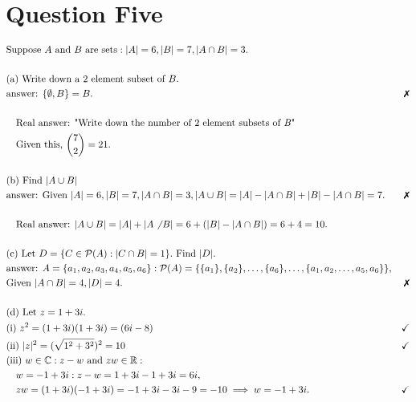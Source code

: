 \documentclass{article}
\begin{document}
    \section{Question Five}
        \begin{align*}
            &\text{Suppose }A \AND B \text{ are sets}: |A| = 6, |B| = 7, |A\cap B| = 3.\\
            &\\
            &\text{(a) Write down a 2 element subset of }B.\\
            &\text{answer: }\{\emptyset, B\} = B.&\xmark\\
            &\\
            &\quad\text{Real answer: "Write down the number of 2 element subsets of \textit{B}"}\\
            &\quad\text{Given this, } \binom{7}{2} = 21.\\
            &\\
            &\text{(b) Find }|A\cup B|\\
            &\text{answer: Given }|A| = 6, |B| = 7, |A\cap B| = 3, |A\cup B| = |A|-|A\cap B| + |B|-|A\cap B| = 7.&\xmark\\
            &\\
            &\quad\text{Real answer: }|A\cup B| = |A| + |A\not ~B| = 6 + (|B| - |A\cap B|) = 6 + 4 = 10.\\
            &\\
            &\text{(c) Let }D = \{C\in\power(A) : |C\cap B| = 1\}.\text{ Find }|D|.\\
            &\text{answer: }A = \{a_1, a_2, a_3, a_4, a_5, a_6\} : \power(A) = \{\{a_1\}, \{a_2\}, \dots, \{a_6\}, \dots, \{a_1, a_2, \dots, a_5, a_6\}\},\\
            &\text{Given }|A\cap B| = 4, |D| = 4.&\xmark\\
            &\\
            &\text{(d) Let }z = 1 + 3i.\\
            &\text{(i) }z^2 = (1+3i)(1+3i) = (6i - 8) & \checkmark\\
            &\text{(ii) }|z|^2 = (\sqrt{1^2 + 3^2})^2 = 10&\checkmark\\
            &\text{(iii) }w\inc: z-w \AND zw \inr:\\
            &\quad w = -1 + 3i: z - w = 1 + 3i - 1 + 3i = 6i,\\
            &\quad zw = (1 + 3i)(-1 + 3i) = -1 + 3i - 3i -9 = -10 \implies w = -1 + 3i.& \checkmark\\
        \end{align*}
\end{document}
